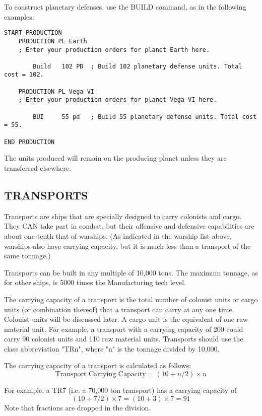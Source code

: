 \documentclass[10pt,titlepage]{article}
\begin{document}
To construct planetary defenses, use the BUILD command, as in the following
examples:
\begin{verbatim}
START PRODUCTION
    PRODUCTION PL Earth
    ; Enter your production orders for planet Earth here.

        Build   102 PD  ; Build 102 planetary defense units. Total cost = 102.

    PRODUCTION PL Vega VI
    ; Enter your production orders for planet Vega VI here.

        BUI     55 pd   ; Build 55 planetary defense units. Total cost = 55.

END PRODUCTION
\end{verbatim}
The units produced will remain on the producing planet unless they are
transferred elsewhere.


\subsection{TRANSPORTS}
\label{sec:transports}

Transports are ships that are specially designed to carry colonists and cargo.
They CAN take part in combat, but their offensive and defensive capabilities
are about one-tenth that of warships.  (As indicated in the warship list above,
warships also have carrying capacity, but it is much less than a transport of
the same tonnage.)

Transports can be built in any multiple of 10,000 tons.  The maximum tonnage,
as for other ships, is 5000 times the Manufacturing tech level.

The carrying capacity of a transport is the total number of colonist units or
cargo units (or combination thereof) that a transport can carry at any one
time.  Colonist units will be discussed later.  A cargo unit is the equivalent
of one raw material unit.  For example, a transport with a carrying capacity
of 200 could carry 90 colonist units and 110 raw material units.  Transports
should use the class abbreviation "TRn", where "n" is the tonnage divided by
10,000.

The carrying capacity of a transport is calculated as follows:
\begin{equation*}
	\textrm{Transport Carrying Capacity}  =  (10 + n/2) \times n
\end{equation*}

For example, a TR7 (i.e. a 70,000 ton transport) has a carrying capacity of
\[
(10 + 7/2) \times 7 = (10 + 3) \times 7 = 91 
\]
Note that fractions are dropped in the division.
\end{document}
